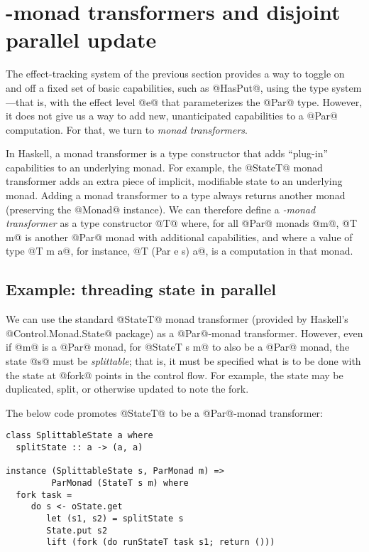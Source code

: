 \section{-monad transformers and disjoint parallel update}\label{s:lvish-disjoint}

The effect-tracking system of the previous section provides a way to
toggle on and off a fixed set of basic capabilities, such as @HasPut@,
using the type system---that is, with the effect level @e@ that
parameterizes the @Par@ type.  However, it does not give us a way to
add new, unanticipated capabilities to a @Par@ computation.  For that,
we turn to \emph{monad transformers}.

In Haskell, a monad transformer is a type constructor that adds
``plug-in'' capabilities to an underlying monad.  For example, the
@StateT@ monad transformer adds an extra piece of implicit, modifiable
state to an underlying monad.  Adding a monad transformer to a type
always returns another monad (preserving the @Monad@ instance).  We
can therefore define a \emph{-monad transformer} as a type
constructor @T@ where, for all @Par@ monads @m@, @T m@ is another
@Par@ monad with additional capabilities, and where a value of type
@T m a@, for instance, @T (Par e s) a@, is a computation in that monad.

\subsection{Example: threading state in parallel}

We can use the standard @StateT@ monad transformer (provided by
Haskell's @Control.Monad.State@ package) as a @Par@-monad transformer.
However, even if @m@ is a @Par@ monad, for @StateT s m@ to also be a
@Par@ monad, the state @s@ must be \emph{splittable}; that is, it must
be specified what is to be done with the state at @fork@ points in the
control flow.  For example, the state may be duplicated, split, or
otherwise updated to note the fork.

The below code promotes @StateT@ to be a @Par@-monad transformer:

\singlespacing
\begin{lstlisting}
class SplittableState a where
  splitState :: a -> (a, a)

instance (SplittableState s, ParMonad m) => 
         ParMonad (StateT s m) where  
  fork task =
     do s <- oState.get 
        let (s1, s2) = splitState s
        State.put s2
        lift (fork (do runStateT task s1; return ()))
\end{lstlisting}
\doublespacing

